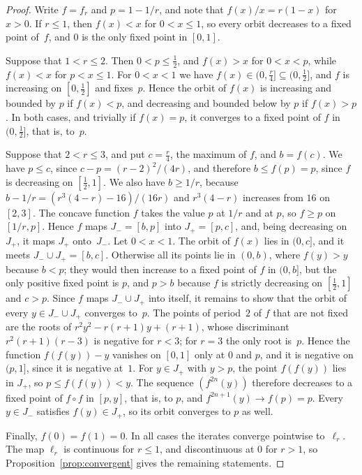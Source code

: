 \begin{proof}
Write $f=f_r$ and $p=1-1/r$, and note that $f(x)/x=r(1-x)$ for $x>0$.
If $r\le1$, then $f(x)<x$ for $0<x\le1$, so every orbit decreases to a fixed
point of~$f$, and $0$ is the only fixed point in $[0,1]$.

Suppose that $1<r\le2$.
Then $0<p\le\frac12$, and $f(x)>x$ for $0<x<p$, while $f(x)<x$ for $p<x\le1$.
For $0<x<1$ we have $f(x)\in(0,\frac r4]\subseteq(0,\frac12]$, and $f$ is
increasing on $[0,\frac12]$ and fixes~$p$.
Hence the orbit of $f(x)$ is increasing and bounded by $p$ if $f(x)<p$, and
decreasing and bounded below by $p$ if $f(x)>p$.
In both cases, and trivially if $f(x)=p$, it converges to a fixed point of $f$
in $(0,\frac12]$, that is, to~$p$.

Suppose that $2<r\le3$, and put $c=\frac r4$, the maximum of $f$, and $b=f(c)$.
We have $p\le c$, since $c-p=(r-2)^2/(4r)$, and therefore $b\le f(p)=p$, since
$f$ is decreasing on $[\frac12,1]$.
We also have $b\ge1/r$, because $b-1/r=(r^3(4-r)-16)/(16r)$ and $r^3(4-r)$
increases from $16$ on $[2,3]$.
The concave function $f$ takes the value $p$ at $1/r$ and at $p$, so $f\ge p$
on $[1/r,p]$.
Hence $f$ maps $J_-=[b,p]$ into $J_+=[p,c]$, and, being decreasing on $J_+$,
it maps $J_+$ onto~$J_-$.
Let $0<x<1$.
The orbit of $f(x)$ lies in $(0,c]$, and it meets $J_-\cup J_+=[b,c]$.
Otherwise all its points lie in $(0,b)$, where $f(y)>y$ because $b<p$; they
would then increase to a fixed point of $f$ in $(0,b]$, but the only positive
fixed point is $p$, and $p>b$ because $f$ is strictly decreasing on
$[\frac12,1]$ and $c>p$.
Since $f$ maps $J_-\cup J_+$ into itself, it remains to show that the orbit of every $y\in J_-\cup J_+$ converges to~$p$.
The points of period~$2$ of $f$ that are not fixed are the roots of
$r^2y^2-r(r+1)y+(r+1)$, whose discriminant $r^2(r+1)(r-3)$ is negative for
$r<3$; for $r=3$ the only root is~$p$.
Hence the function $f(f(y))-y$ vanishes on $[0,1]$ only at $0$ and $p$, and it
is negative on $(p,1]$, since it is negative at~$1$.
For $y\in J_+$ with $y>p$, the point $f(f(y))$ lies in $J_+$, so
$p\le f(f(y))<y$.
The sequence $(f^{2n}(y))$ therefore decreases to a fixed point of $f\circ f$ in
$[p,y]$, that is, to $p$, and $f^{2n+1}(y)\to f(p)=p$.
Every $y\in J_-$ satisfies $f(y)\in J_+$, so its orbit converges to $p$ as well.

Finally, $f(0)=f(1)=0$.
In all cases the iterates converge pointwise to~$\ell_r$.
The map $\ell_r$ is continuous for $r\le1$, and discontinuous at $0$ for
$r>1$, so Proposition~\ref{prop:convergent} gives the remaining statements.
\end{proof}

